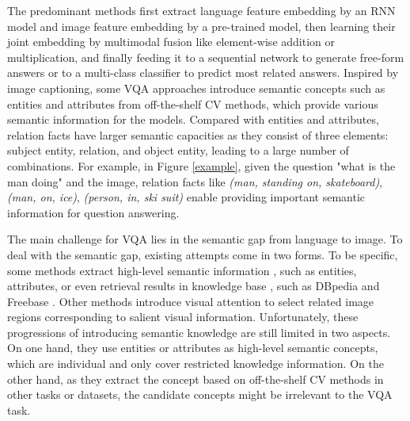 \documentclass[sigconf]{acmart}
\begin{document}
The predominant methods first extract language feature embedding by an RNN model and image feature embedding by a pre-trained model, then learning their joint embedding by multimodal fusion like element-wise addition or multiplication, and finally feeding it to a sequential network to generate free-form answers or to a multi-class classifier to predict most related answers. 
Inspired by image captioning, some VQA approaches \cite{wu2016ask,li2017incorporating,wu2017image} introduce semantic concepts such as entities and attributes from off-the-shelf CV methods, which provide various semantic information for the models.
Compared with entities and attributes, relation facts have larger semantic capacities as they consist of three elements: subject entity, relation, and object entity, leading to a large number of combinations. For example, in Figure \ref{example}, given the question "what is the man doing" and the image, relation facts like \textit{(man, standing on, skateboard)},  \textit{(man, on, ice)}, \textit{(person, in, ski suit)} enable providing important semantic information for question answering.



The main challenge for VQA lies in the semantic gap from language to image. To deal with the semantic gap, existing attempts come in
two forms. To be specific, some methods extract high-level semantic information \cite{wu2016ask,li2017incorporating,wu2017image}, such as entities, attributes, or even retrieval results in knowledge base \cite{li2017incorporating}, such as DBpedia \cite{auer2007dbpedia} and Freebase \cite{bollacker2008freebase}. Other methods introduce visual attention \cite{xu2016ask,yang2016stacked,kim2016hadamard} to select related image regions corresponding to salient visual information. 
Unfortunately, these progressions of introducing semantic knowledge are still limited in two aspects. On one hand, they use entities or attributes as high-level semantic concepts, which are individual and only cover restricted knowledge information. On the other hand, as they extract the concept based on off-the-shelf CV methods in other tasks or datasets, the candidate concepts might be irrelevant to the VQA task.
\end{document}
